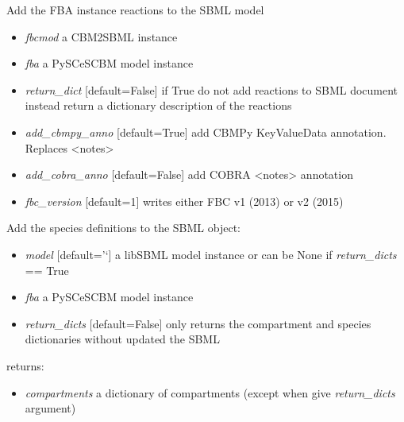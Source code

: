 \documentclass[a4paper,11pt,english]{sphinxmanual}
\begin{document}
\begin{fulllineitems}
\label{modules_doc:cbmpy.CBXML.sbml_setReactionsL3Fbc}
Add the FBA instance reactions to the SBML model
\begin{itemize}
\item {} 
\emph{fbcmod} a CBM2SBML instance

\item {} 
\emph{fba} a PySCeSCBM model instance

\item {} 
\emph{return\_dict} {[}default=False{]} if True do not add reactions to SBML document instead return a dictionary description of the reactions

\item {} 
\emph{add\_cbmpy\_anno} {[}default=True{]} add CBMPy KeyValueData annotation. Replaces \textless{}notes\textgreater{}

\item {} 
\emph{add\_cobra\_anno} {[}default=False{]} add COBRA \textless{}notes\textgreater{} annotation

\item {} 
\emph{fbc\_version} {[}default=1{]} writes either FBC v1 (2013) or v2 (2015)

\end{itemize}

\end{fulllineitems}


\begin{fulllineitems}
\label{modules_doc:cbmpy.CBXML.sbml_setSpeciesL2}
Add the species definitions to the SBML object:
\begin{itemize}
\item {} 
\emph{model} {[}default='`{]} a libSBML model instance or can be None if \emph{return\_dicts} == True

\item {} 
\emph{fba} a PySCeSCBM model instance

\item {} 
\emph{return\_dicts} {[}default=False{]} only returns the compartment and species dictionaries without updated the SBML

\end{itemize}

returns:
\begin{itemize}
\item {} 
\emph{compartments} a dictionary of compartments (except when give \emph{return\_dicts} argument)

\end{itemize}

\end{fulllineitems}
\end{document}
